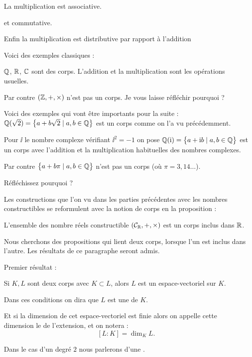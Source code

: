 La multiplication est associative.

et commutative.

\change
Enfin la multiplication est distributive par rapport à l'addition


\diapo

Voici des exemples classiques :

\change
$\mathbb{Q}$, $\mathbb{R}$, $\mathbb{C}$ sont des corps.
 L'addition et la multiplication sont les opérations usuelles.
 
\change
Par contre $(\mathbb{Z},+,\times)$ n'est pas un corps. Je vous laisse réfléchir pourquoi ?

\change
Voici des exemples qui vont être importants pour la suite :
$\mathbb{Q}(\sqrt 2) = \big\{ a+b\sqrt 2 \mid a,b \in \mathbb{Q} \big\}$ est un corps
comme on l'a vu précédemment.

\change
Pour $\ii$ le nombre complexe vérifiant $\ii^2 = -1$ on pose
$\mathbb{Q}(\mathrm{i}) =  \big\{ a+\mathrm{i} b \mid a,b \in \mathbb{Q}  \big\}$ est un corps
avec l'addition et la multiplication habituelles des nombres complexes.

\change
Par contre  
$\big\{ a+b \pi \mid a,b \in \mathbb{Q}  \big\}$ n'est pas un corps (où $\pi = 3,14\ldots$). 

Réfléchissez pourquoi ?

\change
Les constructions que l'on vu dans les parties précédentes avec les nombres constructibles
se reformulent avec la notion de corps en la proposition :

L'ensemble des nombre réels constructible $(\mathcal{C}_{\mathbb{R}}, +, \times)$ est un corps inclus dans $\mathbb{R}$.



\diapo

Nous cherchons des propositions qui lient deux corps, lorsque l'un est inclus dans l'autre.
Les résultats de ce paragraphe seront admis.

Premier résultat :

Si $K, L$ sont deux corps avec $K \subset L$, alors $L$ est un espace-vectoriel sur $K$.


\change
Dans ces conditions on dira que 
$L$ est une  de $K$.

\change
Et si la dimension de cet espace-vectoriel est finie alors
on appelle cette dimension le  de l'extension, et on notera :
$$[L:K] = \dim_K L.$$

\change
Dans le cas d'un degré $2$ nous parlerons d'une .

